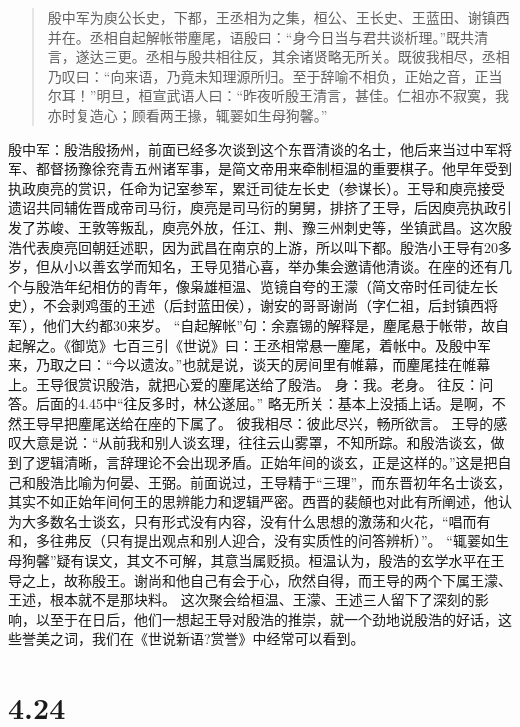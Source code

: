 \documentclass[]{book}
\begin{document}
\begin{quote}
殷中军为庾公长史，下都，王丞相为之集，桓公、王长史、王蓝田、谢镇西并在。丞相自起解帐带麈尾，语殷曰：``身今日当与君共谈析理。''既共清言，遂达三更。丞相与殷共相往反，其余诸贤略无所关。既彼我相尽，丞相乃叹曰：``向来语，乃竟未知理源所归。至于辞喻不相负，正始之音，正当尔耳！''明旦，桓宣武语人曰：``昨夜听殷王清言，甚佳。仁祖亦不寂寞，我亦时复造心；顾看两王掾，辄翣如生母狗馨。''
\end{quote}

殷中军：殷浩殷扬州，前面已经多次谈到这个东晋清谈的名士，他后来当过中军将军、都督扬豫徐兖青五州诸军事，是简文帝用来牵制桓温的重要棋子。他早年受到执政庾亮的赏识，任命为记室参军，累迁司徒左长史（参谋长）。王导和庾亮接受遗诏共同辅佐晋成帝司马衍，庾亮是司马衍的舅舅，排挤了王导，后因庾亮执政引发了苏峻、王敦等叛乱，庾亮外放，任江、荆、豫三州刺史等，坐镇武昌。这次殷浩代表庾亮回朝廷述职，因为武昌在南京的上游，所以叫下都。殷浩小王导有20多岁，但从小以善玄学而知名，王导见猎心喜，举办集会邀请他清谈。在座的还有几个与殷浩年纪相仿的青年，像枭雄桓温、览镜自夸的王濛（简文帝时任司徒左长史），不会剥鸡蛋的王述（后封蓝田侯），谢安的哥哥谢尚（字仁祖，后封镇西将军），他们大约都30来岁。
``自起解帐''句：余嘉锡的解释是，麈尾悬于帐带，故自起解之。《御览》七百三引《世说》曰：王丞相常悬一麈尾，着帐中。及殷中军来，乃取之曰：``今以遗汝。''也就是说，谈天的房间里有帷幕，而麈尾挂在帷幕上。王导很赏识殷浩，就把心爱的麈尾送给了殷浩。
身：我。老身。 往反：问答。后面的4.45中``往反多时，林公遂屈。''
略无所关：基本上没插上话。是啊，不然王导早把麈尾送给在座的下属了。
彼我相尽：彼此尽兴，畅所欲言。
王导的感叹大意是说：``从前我和别人谈玄理，往往云山雾罩，不知所踪。和殷浩谈玄，做到了逻辑清晰，言辞理论不会出现矛盾。正始年间的谈玄，正是这样的。''这是把自己和殷浩比喻为何晏、王弼。前面说过，王导精于``三理''，而东晋初年名士谈玄，其实不如正始年间何王的思辨能力和逻辑严密。西晋的裴頠也对此有所阐述，他认为大多数名士谈玄，只有形式没有内容，没有什么思想的激荡和火花，``唱而有和，多往弗反（只有提出观点和别人迎合，没有实质性的问答辨析）''。
``辄翣如生母狗馨''疑有误文，其文不可解，其意当属贬损。桓温认为，殷浩的玄学水平在王导之上，故称殷王。谢尚和他自己有会于心，欣然自得，而王导的两个下属王濛、王述，根本就不是那块料。
这次聚会给桓温、王濛、王述三人留下了深刻的影响，以至于在日后，他们一想起王导对殷浩的推崇，就一个劲地说殷浩的好话，这些誉美之词，我们在《世说新语?赏誉》中经常可以看到。

\section{4.24}\label{section-202}
\end{document}
